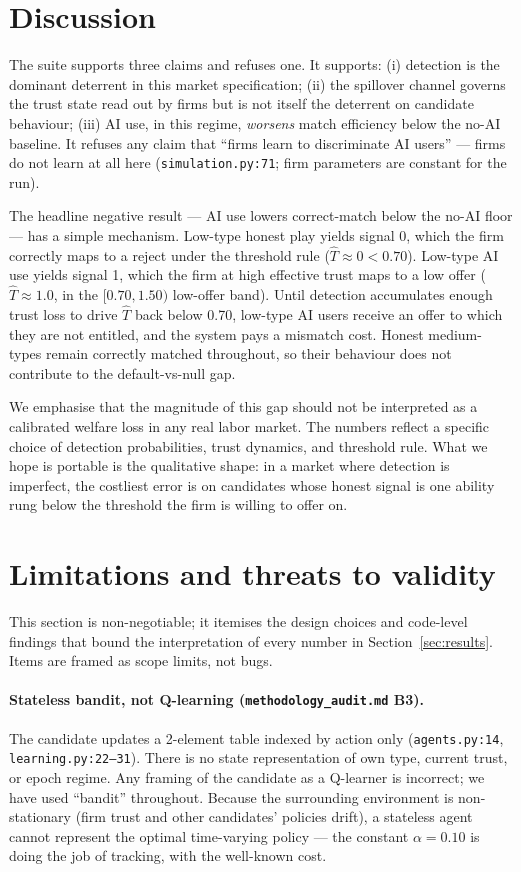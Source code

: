\documentclass[11pt]{article}
\begin{document}
\section{Discussion}

The suite supports three claims and refuses one. It supports: (i) detection
is the dominant deterrent in this market specification; (ii) the
spillover channel governs the trust state read out by firms but is not
itself the deterrent on candidate behaviour; (iii) AI use, in this regime,
\emph{worsens} match efficiency below the no-AI baseline. It refuses any
claim that ``firms learn to discriminate AI users'' --- firms do not learn at
all here (\texttt{simulation.py:71}; firm parameters are constant for the
run).

The headline negative result --- AI use lowers correct-match below the no-AI
floor --- has a simple mechanism. Low-type honest play yields signal 0,
which the firm correctly maps to a reject under the threshold rule
(\(\hat{T} \approx 0 < 0.70\)). Low-type AI use yields signal 1, which the
firm at high effective trust maps to a low offer
(\(\hat{T} \approx 1.0\), in the \([0.70, 1.50)\) low-offer band). Until
detection accumulates enough trust loss to drive \(\hat{T}\) back below
0.70, low-type AI users receive an offer to which they are not entitled,
and the system pays a mismatch cost. Honest medium-types remain correctly
matched throughout, so their behaviour does not contribute to the
default-vs-null gap.

We emphasise that the magnitude of this gap should not be interpreted as a
calibrated welfare loss in any real labor market. The numbers reflect a
specific choice of detection probabilities, trust dynamics, and threshold
rule. What we hope is portable is the qualitative shape: in a market where
detection is imperfect, the costliest error is on candidates whose honest
signal is one ability rung below the threshold the firm is willing to offer
on.

\section{Limitations and threats to validity}\label{sec:limits}

This section is non-negotiable; it itemises the design choices and code-level
findings that bound the interpretation of every number in
Section~\ref{sec:results}. Items are framed as scope limits, not bugs.

\paragraph{Stateless bandit, not Q-learning
(\texttt{methodology\_audit.md} B3).}
The candidate updates a 2-element table indexed by action only
(\texttt{agents.py:14}, \texttt{learning.py:22--31}). There is no state
representation of own type, current trust, or epoch regime. Any framing
of the candidate as a Q-learner is incorrect; we have used ``bandit''
throughout. Because the surrounding environment is non-stationary
(firm trust and other candidates' policies drift), a stateless agent
cannot represent the optimal time-varying policy --- the constant
\(\alpha=0.10\) is doing the job of tracking, with the well-known cost.
\end{document}
